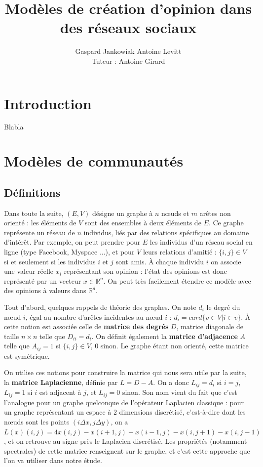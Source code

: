 \documentclass[12pt]{article}
\newcommand{\R}{\mathbb{R}}
\begin{document}
\author{Gaspard Jankowiak \quad Antoine Levitt\\ Tuteur : Antoine Girard}
\title{Modèles de création d'opinion dans des réseaux sociaux}
\maketitle
{}
\tableofcontents
\newpage


\section{Introduction}
Blabla


\section{Modèles de communautés}
\subsection{Définitions}
Dans toute la suite, $(E, V)$ désigne un graphe à $n$ n\oe uds et $m$
arêtes non orienté : les éléments de $V$ sont des ensembles à deux
éléments de $E$. Ce graphe représente un réseau de $n$ individus, liés
par des relations spécifiques au domaine d'intérêt. Par exemple, on
peut prendre pour $E$ les individus d'un réseau social en ligne (type
Facebook, Myspace ...), et pour $V$ leurs relations d'amitié : $\{i,
j\} \in V$ si et seulement si les individus $i$ et $j$ sont amis. À chaque individu
$i$ on associe une valeur réelle $x_i$ représentant son opinion :
l'état des opinions est donc représenté par un vecteur $x \in
\R^n$. On peut très facilement étendre ce modèle avec des opinions à valeurs
dans $\R^d$.

Tout d'abord, quelques rappels de théorie des graphes. On note $d_i$
le degré du n\oe ud $i$, égal au nombre d'arêtes incidentes au n\oe ud
$i$ : $d_i = card \{v \in V | i \in v\}$. À cette notion est
associée celle de {\bf matrice des degrés} $D$, matrice diagonale
de taille $n \times n$ telle que $D_{i i} = d_i$. On définit
également la {\bf matrice d'adjacence} $A$ telle que $A_{i j} = 1$
si $\{i, j\} \in V$, $0$ sinon. Le graphe étant non orienté, cette
matrice est symétrique.

On utilise ces notions pour construire la matrice qui nous sera
utile par la suite, la {\bf matrice Laplacienne}, définie par $L
= D - A$. On a donc $L_{i j} = d_i$ si $i = j$, $L_{i j} = 1$ si
$i$ est adjacent à $j$, et $L_{i j} = 0$ sinon. Son nom vient du
fait que c'est l'analogue pour un graphe quelconque de
l'opérateur Laplacien classique : pour un graphe représentant un
espace à $2$ dimensions discrétisé, c'est-à-dire dont les n\oe uds
sont les points $(i \Delta x, j \Delta y)$, on a $L(x) (i, j) =
4 x(i, j) - x(i+1, j) - x(i-1, j) - x(i, j+1) - x(i, j-1)$, et
on retrouve au signe près le Laplacien discrétisé. Les
propriétés (notamment spectrales) de cette matrice renseignent
sur le graphe, et c'est cette approche que l'on va utiliser dans
notre étude.
\end{document}
